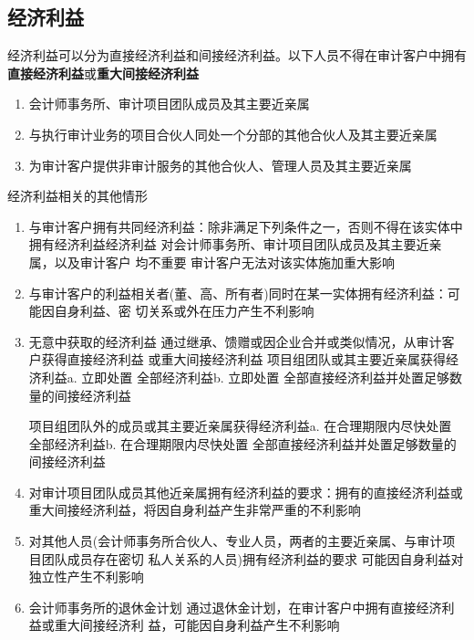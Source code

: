 \documentclass[UTF8,12pt]{ctexart}
\numberwithin{equation}{section} %
\numberwithin{figure}{section}
\numberwithin{table}{section}
\begin{document}
	
	\subsection{经济利益}
	经济利益可以分为直接经济利益和间接经济利益。以下人员不得在审计客户中拥有\textbf{直接经济利益}或\textbf{重大间接经济利益}
	\begin{enumerate}
		\item 会计师事务所、审计项目团队成员及其主要近亲属
		
		\item 与执行审计业务的项目合伙人同处一个分部的其他合伙人及其主要近亲属 
		
		\item 为审计客户提供非审计服务的其他合伙人、管理人员及其主要近亲属
	\end{enumerate}
	
	经济利益相关的其他情形
	\begin{enumerate}
		\item 与审计客户拥有共同经济利益：除非满足下列条件之一，否则不得在该实体中拥有经济利益经济利益  
		对会计师事务所、审计项目团队成员及其主要近亲属，以及审计客户  均不重要 
		审计客户无法对该实体施加重大影响
		
		\item 与审计客户的利益相关者(董、高、所有者)同时在某一实体拥有经济利益：可能因自身利益、密 切关系或外在压力产生不利影响
		
		\item 无意中获取的经济利益   通过继承、馈赠或因企业合并或类似情况，从审计客户获得直接经济利益 或重大间接经济利益
		项目组团队或其主要近亲属获得经济利益a. 立即处置 全部经济利益b. 立即处置 全部直接经济利益并处置足够数量的间接经济利益 
		
		项目组团队外的成员或其主要近亲属获得经济利益a. 在合理期限内尽快处置 全部经济利益b. 在合理期限内尽快处置 全部直接经济利益并处置足够数量的间接经济利益
		
		\item 对审计项目团队成员其他近亲属拥有经济利益的要求：拥有的直接经济利益或重大间接经济利益，将因自身利益产生非常严重的不利影响
		
		\item 对其他人员(会计师事务所合伙人、专业人员，两者的主要近亲属、与审计项目团队成员存在密切 私人关系的人员)拥有经济利益的要求   可能因自身利益对独立性产生不利影响
		
		\item 会计师事务所的退休金计划   通过退休金计划，在审计客户中拥有直接经济利益或重大间接经济利 益，可能因自身利益产生不利影响
	\end{enumerate}
	
\end{document}
